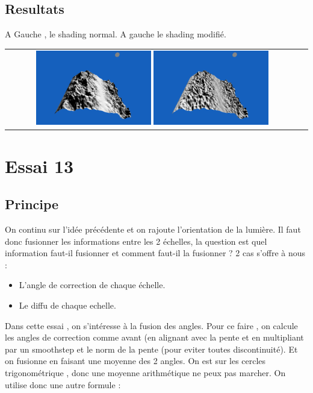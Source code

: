 \documentclass[a4paper]{article}
\begin{document}
\subsection{Resultats}
A Gauche , le shading normal. A gauche le shading modifié. \\
\begin{tabular}{cc}
\includegraphics[width=0.4\textwidth]{Images/Essais/Essai_12_phong.png}
\includegraphics[width=0.4\textwidth]{Images/Essais/Essai_12_phong_editnormal.png}
\end{tabular}




\section{Essai 13}
\subsection{Principe}
On continu sur l'idée précédente et on rajoute l'orientation de la lumière. Il faut donc fusionner les informations entre les 2 échelles, la question est quel information faut-il fusionner et comment faut-il la fusionner ?
2 cas s'offre à nous : 
\begin{itemize}
\item L'angle de correction de chaque échelle.
\item Le diffu de chaque echelle.
\end{itemize} 

Dans cette essai , on s'intéresse à la fusion des angles.
Pour ce faire , on calcule les angles de correction comme avant (en alignant avec la pente et en multipliant par un smoothstep  et le norm de la pente (pour eviter toutes discontinuité). 
Et on fusionne en faisant une moyenne des 2 angles. On est sur les cercles trigonométrique , donc une moyenne arithmétique ne peux pas marcher. On utilise donc une autre formule : \\
\end{document}
